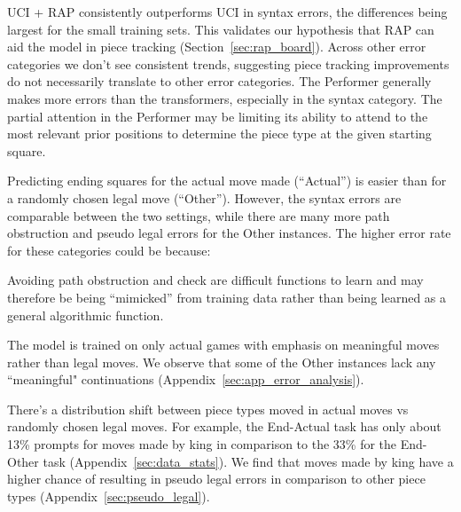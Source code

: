 UCI + RAP %
consistently outperforms %
UCI in syntax errors, %
the differences being largest for the small training sets. This validates our hypothesis that RAP can aid the model in piece tracking (Section~\ref{sec:rap_board}). Across other error categories we don't see consistent trends, suggesting piece tracking improvements do not necessarily translate to other error categories. The Performer generally makes more errors than the transformers, especially in the syntax category. The partial attention in the Performer may be limiting its ability to attend to the most relevant prior positions to determine the piece type at the given starting square. 

Predicting ending squares for the actual move made (``Actual'') is easier than for a randomly chosen legal move (``Other''). However, the syntax errors are comparable between the two settings, while there are many more path obstruction and pseudo legal errors for the Other instances. 
	The higher error rate for these categories could be because:
	\begin{itemizesquish}
		\item Avoiding path obstruction and check are difficult functions to learn and may therefore be being ``mimicked'' from training data rather than being learned as a general algorithmic function.
		\item The model is trained on only actual games with emphasis on meaningful moves rather than legal moves. We observe that some of the Other instances lack any ``meaningful" continuations (Appendix~\ref{sec:app_error_analysis}).
		\item There's a distribution shift between piece types moved in actual moves vs randomly chosen legal moves. 
		For example, the End-Actual task has only about 13\% prompts for moves made by king in comparison to the 33\% for the End-Other task (Appendix~\ref{sec:data_stats}).  We find that moves made by king have a higher chance of resulting in pseudo legal errors in comparison to other piece types (Appendix~\ref{sec:pseudo_legal}).  
	\end{itemizesquish} 






